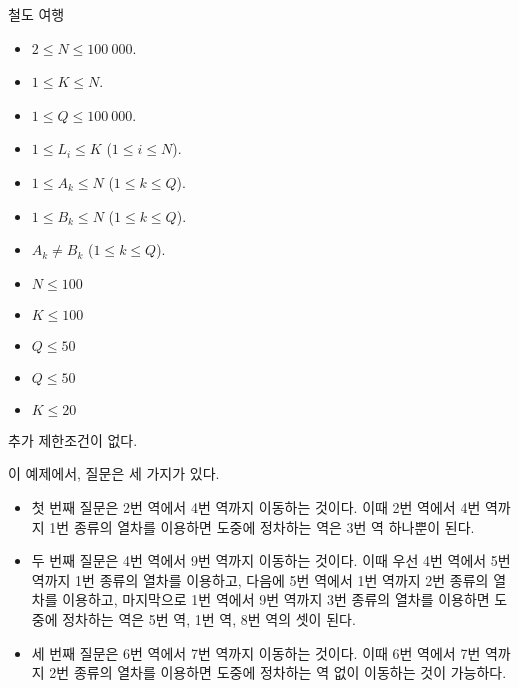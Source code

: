 \begin{problem}{철도 여행}
	\Constraints
	
	\begin{itemize}
		
		\item $2 \le N \le 100\ 000$.
		\item $1 \le K \le N$.
		\item $1 \le Q \le 100\ 000$.
		\item $1 \le L_i \le K$ ($1 \le i \le N$).
		\item $1 \le A_k \le N$ ($1 \le k \le Q$).
		\item $1 \le B_k \le N$ ($1 \le k \le Q$).
		\item $A_k \ne B_k$ ($1 \le k \le Q$).
	\end{itemize}
	
	
	\begin{itemize}
		\item $N \le 100$
		\item $K \le 100$
		\item $Q \le 50$
	\end{itemize}

	\begin{itemize}
		\item $Q \le 50$
	\end{itemize}

	\begin{itemize}
		\item $K \le 20$
	\end{itemize}
	
	
	추가 제한조건이 없다.
	
	\Examples
	
	\begin{example}
	\end{example}
	
	이 예제에서, 질문은 세 가지가 있다.
	
	\begin{itemize}
		\item 첫 번째 질문은 2번 역에서 4번 역까지 이동하는 것이다. 이때 2번 역에서 4번 역까지 1번 종류의 열차를 이용하면 도중에 정차하는 역은 3번 역 하나뿐이 된다.
		\item 두 번째 질문은 4번 역에서 9번 역까지 이동하는 것이다. 이때 우선 4번 역에서 5번 역까지 1번 종류의 열차를 이용하고, 다음에 5번 역에서 1번 역까지 2번 종류의 열차를 이용하고, 마지막으로 1번 역에서 9번 역까지 3번 종류의 열차를 이용하면 도중에 정차하는 역은 5번 역, 1번 역, 8번 역의 셋이 된다.
		\item 세 번째 질문은 6번 역에서 7번 역까지 이동하는 것이다. 이때 6번 역에서 7번 역까지 2번 종류의 열차를 이용하면 도중에 정차하는 역 없이 이동하는 것이 가능하다.
	\end{itemize}
	


\end{problem}

